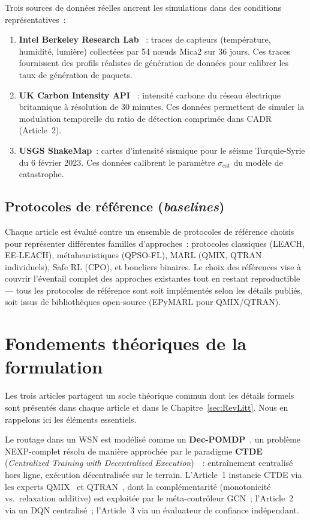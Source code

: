 Trois sources de données réelles ancrent les simulations dans des conditions représentatives~:
\begin{enumerate}
    \item \textbf{Intel Berkeley Research Lab} \cite{intel_lab_data}~: traces de capteurs (température, humidité, lumière) collectées par 54 n\oe{}uds Mica2 sur 36 jours. Ces traces fournissent des profils réalistes de génération de données pour calibrer les taux de génération de paquets.
    \item \textbf{UK Carbon Intensity API} \cite{uk_carbon_api}~: intensité carbone du réseau électrique britannique à résolution de 30 minutes. Ces données permettent de simuler la modulation temporelle du ratio de détection comprimée dans CADR (Article~2).
    \item \textbf{USGS ShakeMap}~: cartes d'intensité sismique pour le séisme Turquie-Syrie du 6 février 2023. Ces données calibrent le paramètre $\sigma_{\text{cat}}$ du modèle de catastrophe.
\end{enumerate}

\subsection{Protocoles de référence (\emph{baselines})}

Chaque article est évalué contre un ensemble de protocoles de référence choisis pour représenter différentes familles d'approches~: protocoles classiques (LEACH, EE-LEACH), métaheuristiques (QPSO-FL), MARL (QMIX, QTRAN individuels), Safe RL (CPO), et boucliers binaires. Le choix des références vise à couvrir l'éventail complet des approches existantes tout en restant reproductible --- tous les protocoles de référence sont soit implémentés selon les détails publiés, soit issus de bibliothèques open-source (EPyMARL pour QMIX/QTRAN).


\section{Fondements théoriques de la formulation}\label{sec:demarche-theoretical}

Les trois articles partagent un socle théorique commun dont les détails formels sont présentés dans chaque article et dans le Chapitre~\ref{sec:RevLitt}. Nous en rappelons ici les éléments essentiels.

Le routage dans un WSN est modélisé comme un \textbf{Dec-POMDP}~\cite{Bernstein2002DecPOMDP, OliehoekAmato2016}, un problème NEXP-complet résolu de manière approchée par le paradigme \textbf{CTDE} (\emph{Centralized Training with Decentralized Execution})~\cite{OliehoekAmato2016}~: entraînement centralisé hors ligne, exécution décentralisée sur le terrain. L'Article~1 instancie CTDE via les experts QMIX~\cite{rashid2018qmix} et QTRAN~\cite{son2019qtran}, dont la complémentarité (monotonicité vs.\ relaxation additive) est exploitée par le méta-contrôleur GCN~; l'Article~2 via un DQN centralisé~; l'Article~3 via un évaluateur de confiance indépendant.

